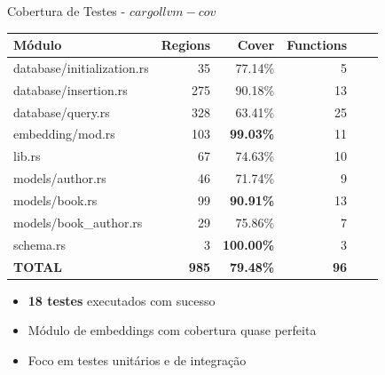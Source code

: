 \documentclass{beamer}
\begin{document}
\begin{frame}{Cobertura de Testes -  $cargo llvm-cov$}
\begin{center}
\footnotesize
\begin{tabular}{@{}p{3.5cm}rrrrr@{}}
\toprule
\textbf{Módulo} & \textbf{Regions} & \textbf{Cover} & \textbf{Functions} \\
\midrule
database/initialization.rs & 35 & 77.14\% & 5 \\
database/insertion.rs & 275 & 90.18\% & 13 \\
database/query.rs & 328 & 63.41\% & 25 \\
embedding/mod.rs & 103 & \textbf{99.03\%} & 11 \\
lib.rs & 67 & 74.63\% & 10 \\
models/author.rs & 46 & 71.74\% & 9 \\
models/book.rs & 99 & \textbf{90.91\%} & 13 \\
models/book\_author.rs & 29 & 75.86\% & 7 \\
schema.rs & 3 & \textbf{100.00\%} & 3 \\
\midrule
\textbf{TOTAL} & \textbf{985} & \textbf{79.48\%} & \textbf{96} \\
\bottomrule
\end{tabular}
\end{center}

\vspace{0.5cm}
\begin{itemize}
\item \textbf{18 testes} executados com sucesso
\item Módulo de embeddings com cobertura quase perfeita
\item Foco em testes unitários e de integração
\end{itemize}
\end{frame}
\end{document}
